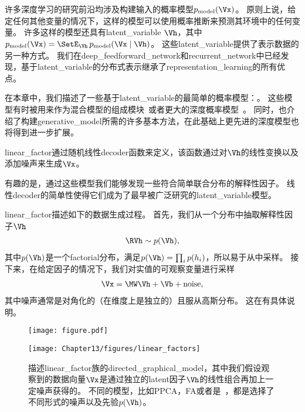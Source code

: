 \chapter{}
\label{chap:linear_factor_models}




许多深度学习的研究前沿均涉及构建输入的概率模型$p_{\text{model}}(\Vx)$。
原则上说，给定任何其他变量的情况下，这样的模型可以使用概率推断来预测其环境中的任何变量。
许多这样的模型还具有\gls{latent_variable} $\Vh$，其中$p_{\text{model}}(\Vx) = \SetE_{\Vh}\, p_{\text{model}}(\Vx\mid\Vh)$。
这些\gls{latent_variable}提供了表示数据的另一种方式。
我们在\gls{deep_feedforward_network}和\gls{recurrent_network}中已经发现，基于\gls{latent_variable}的分布式表示继承了\gls{representation_learning}的所有优点。


在本章中，我们描述了一些基于\gls{latent_variable}的最简单的概率模型：。
这些模型有时被用来作为混合模型的组成模块~\citep{Hinton-nips95,ghahramani96em,Roweis+Saul+Hinton-2002}或者更大的深度概率模型~\citep{tang2012deep}。
同时，也介绍了构建\gls{generative_model}所需的许多基本方法，在此基础上更先进的深度模型也将得到进一步扩展。


\gls{linear_factor}通过随机线性\gls{decoder}函数来定义，该函数通过对$\Vh$的线性变换以及添加噪声来生成$\Vx$。


有趣的是，通过这些模型我们能够发现一些符合简单联合分布的解释性因子。
线性\gls{decoder}的简单性使得它们成为了最早被广泛研究的\gls{latent_variable}模型。


\gls{linear_factor}描述如下的数据生成过程。 
首先，我们从一个分布中抽取解释性因子$\Vh$
\begin{align}
\label{eqn:131}
\RVh \sim p(\Vh),
\end{align}
其中$p(\Vh)$是一个\gls{factorial}分布，满足$p(\Vh) = \prod_{i}^{}p(h_i)$，所以易于从中采样。
接下来，在给定因子的情况下，我们对实值的可观察变量进行采样
\begin{align}
\label{eqn:132}
\Vx = \MW \Vh + \Vb + \text{noise},
\end{align}
其中噪声通常是对角化的（在维度上是独立的）且服从高斯分布。
这在有具体说明。

\begin{figure}[!htb]
\ifOpenSource
\centerline{\texttt{[image: figure.pdf]}}
\else
	\centerline{\texttt{[image: Chapter13/figures/linear\_factors]}}
\fi
\caption{描述\gls{linear_factor}族的\gls{directed_graphical_model}，其中我们假设观察到的数据向量$\Vx$是通过独立的\gls{latent}因子$\Vh$的线性组合再加上一定噪声获得的。
不同的模型，比如\gls{PPCA}，\gls{FA}或者是~，都是选择了不同形式的噪声以及先验$p(\Vh)$。}
\label{fig:linear_factors}
\end{figure}


